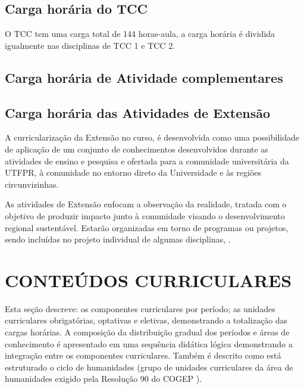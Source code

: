 
\subsection{Carga horária do TCC}

O TCC tem uma carga total de 144 horas-aula, a carga horária é dividida igualmente nas disciplinas de TCC 1 e TCC 2.

\subsection{Carga horária de Atividade complementares}


\subsection{Carga horária das Atividades de Extensão}
\label{sub:extch}

A curricularização da Extensão no curso, é desenvolvida como uma possibilidade de aplicação de um conjunto de conhecimentos desenvolvidos durante as atividades de ensino e pesquisa e ofertada para a comunidade universitária da UTFPR, à comunidade no entorno direto da Universidade e às regiões circunvizinhas.

As atividades de Extensão enfocam a observação da realidade, tratada com o objetivo de produzir impacto junto à comunidade visando o desenvolvimento regional sustentável. Estarão organizadas em torno de programas ou projetos, sendo incluídas no projeto individual de algumas disciplinas, .


\section{CONTEÚDOS CURRICULARES}

Esta seção descreve: os componentes curriculares por período; as unidades curriculares obrigatórias, optativas e eletivas, demonstrando a totalização das cargas horárias.  A composição da distribuição gradual dos períodos e áreas de conhecimento é apresentado em uma sequência didática lógica demonstrando a integração entre os componentes curriculares. Também é descrito como está estruturado o ciclo de humanidades (grupo de unidades curriculares da área de humanidades exigido pela Resolução 90 do COGEP \cite{cogep90}).

